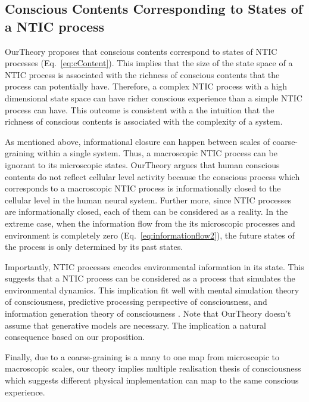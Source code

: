 \documentclass[utf8]{article}
\begin{document}
    			
    
    
    
		\subsection{Conscious Contents Corresponding to States of a NTIC process}\label{sec:cc}
    		\ac{OurTheory} proposes that conscious contents correspond to states of NTIC processes (Eq.~\ref{eq:cContent}). This implies that the size of the state space of a NTIC process is associated with the richness of conscious contents that the process can potentially have. Therefore, a complex NTIC process with a high dimensional state space can have richer conscious experience than a simple NTIC process can have. This outcome is consistent with a the intuition that the richness of conscious contents is associated with the complexity of a system. 
    		
    		As mentioned above, informational closure can happen between scales of coarse-graining within a single system. Thus, a macroscopic NTIC process can be ignorant to its microscopic states. \ac{OurTheory} argues that human conscious contents do not reflect cellular level activity because the conscious process which corresponds to a macroscopic NTIC process is informationally closed to the cellular level in the human neural system. Further more, since NTIC processes are informationally closed, each of them can be considered as a reality. In the extreme case, when the information flow from the its microscopic processes and environment is completely zero (Eq.~\ref{eq:informationflow2}), the future states of the process is only determined by its past states. 
    		
    		Importantly, NTIC processes encodes environmental information in its state. This suggests that a NTIC process can be considered as a process that simulates the environmental dynamics. This implication fit well with mental simulation theory of consciousness, predictive processing perspective of consciousness, and information generation theory of consciousness . Note that \ac{OurTheory} doesn't assume that generative models are necessary. The implication a natural consequence based on our proposition. 
            
            Finally, due to a coarse-graining is a many to one map from microscopic to macroscopic scales, our theory implies multiple realisation thesis of consciousness which suggests different physical implementation can map to the same conscious experience.
            
\end{document}
